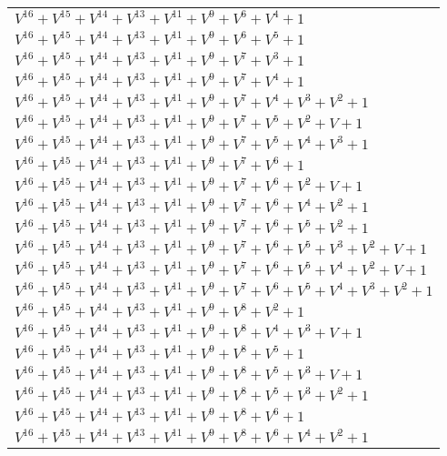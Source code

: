 \documentclass[12pt]{article}
\begin{document}
\begin{adjustwidth}{-4cm}{}
\begin{center}
\begin{longtable}{|l|}
$V^{16}  +V^{15}  +V^{14}  +V^{13}  +V^{11}  +V^{9}  +V^{6}  +V^{4}  + 1$ \\
$V^{16}  +V^{15}  +V^{14}  +V^{13}  +V^{11}  +V^{9}  +V^{6}  +V^{5}  + 1$ \\
$V^{16}  +V^{15}  +V^{14}  +V^{13}  +V^{11}  +V^{9}  +V^{7}  +V^{3}  + 1$ \\
$V^{16}  +V^{15}  +V^{14}  +V^{13}  +V^{11}  +V^{9}  +V^{7}  +V^{4}  + 1$ \\
$V^{16}  +V^{15}  +V^{14}  +V^{13}  +V^{11}  +V^{9}  +V^{7}  +V^{4}  +V^{3}  +V^{2}  + 1$ \\
$V^{16}  +V^{15}  +V^{14}  +V^{13}  +V^{11}  +V^{9}  +V^{7}  +V^{5}  +V^{2}  + V + 1$ \\
$V^{16}  +V^{15}  +V^{14}  +V^{13}  +V^{11}  +V^{9}  +V^{7}  +V^{5}  +V^{4}  +V^{3}  + 1$ \\
$V^{16}  +V^{15}  +V^{14}  +V^{13}  +V^{11}  +V^{9}  +V^{7}  +V^{6}  + 1$ \\
$V^{16}  +V^{15}  +V^{14}  +V^{13}  +V^{11}  +V^{9}  +V^{7}  +V^{6}  +V^{2}  + V + 1$ \\
$V^{16}  +V^{15}  +V^{14}  +V^{13}  +V^{11}  +V^{9}  +V^{7}  +V^{6}  +V^{4}  +V^{2}  + 1$ \\
$V^{16}  +V^{15}  +V^{14}  +V^{13}  +V^{11}  +V^{9}  +V^{7}  +V^{6}  +V^{5}  +V^{2}  + 1$ \\
$V^{16}  +V^{15}  +V^{14}  +V^{13}  +V^{11}  +V^{9}  +V^{7}  +V^{6}  +V^{5}  +V^{3}  +V^{2}  + V + 1$ \\
$V^{16}  +V^{15}  +V^{14}  +V^{13}  +V^{11}  +V^{9}  +V^{7}  +V^{6}  +V^{5}  +V^{4}  +V^{2}  + V + 1$ \\
$V^{16}  +V^{15}  +V^{14}  +V^{13}  +V^{11}  +V^{9}  +V^{7}  +V^{6}  +V^{5}  +V^{4}  +V^{3}  +V^{2}  + 1$ \\
$V^{16}  +V^{15}  +V^{14}  +V^{13}  +V^{11}  +V^{9}  +V^{8}  +V^{2}  + 1$ \\
$V^{16}  +V^{15}  +V^{14}  +V^{13}  +V^{11}  +V^{9}  +V^{8}  +V^{4}  +V^{3}  + V + 1$ \\
$V^{16}  +V^{15}  +V^{14}  +V^{13}  +V^{11}  +V^{9}  +V^{8}  +V^{5}  + 1$ \\
$V^{16}  +V^{15}  +V^{14}  +V^{13}  +V^{11}  +V^{9}  +V^{8}  +V^{5}  +V^{3}  + V + 1$ \\
$V^{16}  +V^{15}  +V^{14}  +V^{13}  +V^{11}  +V^{9}  +V^{8}  +V^{5}  +V^{3}  +V^{2}  + 1$ \\
$V^{16}  +V^{15}  +V^{14}  +V^{13}  +V^{11}  +V^{9}  +V^{8}  +V^{6}  + 1$ \\
$V^{16}  +V^{15}  +V^{14}  +V^{13}  +V^{11}  +V^{9}  +V^{8}  +V^{6}  +V^{4}  +V^{2}  + 1$ \\

\end{longtable}
\end{center}
\end{adjustwidth}
\end{document}
